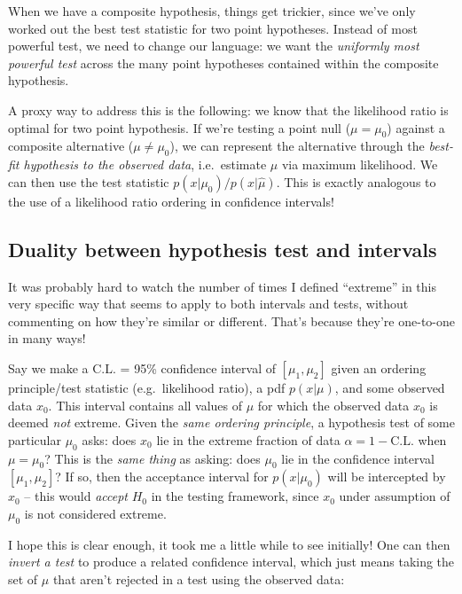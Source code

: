 \documentclass[
  11pt,
  numbers=noendperiod]{book}
\begin{document}
When we have a composite hypothesis, things get trickier, since we've
only worked out the best test statistic for two point hypotheses.
Instead of most powerful test, we need to change our language: we want
the \emph{uniformly most powerful test} across the many point hypotheses
contained within the composite hypothesis.

A proxy way to address this is the following: we know that the
likelihood ratio is optimal for two point hypothesis. If we're testing a
point null (\(\mu=\mu_0\)) against a composite alternative
(\(\mu \neq \mu_0\)), we can represent the alternative through the
\emph{best-fit hypothesis to the observed data}, i.e.~estimate
\(\hat{\mu}\) via maximum likelihood. We can then use the test statistic
\(p(x | \mu_0) / p(x | \hat{\mu})\). This is exactly analogous to the
use of a likelihood ratio ordering in confidence intervals!

\hypertarget{duality-between-hypothesis-test-and-intervals}{%
\subsection{Duality between hypothesis test and
intervals}\label{duality-between-hypothesis-test-and-intervals}}

It was probably hard to watch the number of times I defined ``extreme''
in this very specific way that seems to apply to both intervals and
tests, without commenting on how they're similar or different. That's
because they're one-to-one in many ways!

Say we make a \(\mathrm{C.L.}\) = 95\% confidence interval of
\([\mu_1, \mu_2]\) given an ordering principle/test statistic
(e.g.~likelihood ratio), a pdf \(p(x | \mu)\), and some observed data
\(x_0\). This interval contains all values of \(\mu\) for which the
observed data \(x_0\) is deemed \emph{not} extreme. Given the \emph{same
ordering principle}, a hypothesis test of some particular \(\mu_0\)
asks: does \(x_0\) lie in the extreme fraction of data
\(\alpha = 1-\mathrm{C.L.}\) when \(\mu=\mu_0\)? This is the \emph{same
thing} as asking: does \(\mu_0\) lie in the confidence interval
\([\mu_1, \mu_2]\)? If so, then the acceptance interval for
\(p(x | \mu_0)\) will be intercepted by \(x_0\) -- this would
\emph{accept} \(H_0\) in the testing framework, since \(x_0\) under
assumption of \(\mu_0\) is not considered extreme.

I hope this is clear enough, it took me a little while to see initially!
One can then \emph{invert a test} to produce a related confidence
interval, which just means taking the set of \(\mu\) that aren't
rejected in a test using the observed data:
\end{document}
